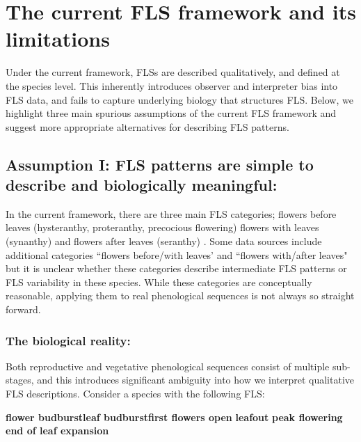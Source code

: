 \documentclass{article}
\begin{document}
{\section*{The current FLS framework and its limitations}
Under the current framework, FLSs are described qualitatively, and defined at the species level. This inherently introduces observer and interpreter bias into FLS data, and fails to capture underlying biology that structures FLS. Below, we highlight three main spurious assumptions of the current FLS framework and suggest more appropriate alternatives for describing FLS patterns.
\subsection*{Assumption I: FLS patterns are simple to describe and biologically meaningful:}
In the current framework, there are three main FLS categories; flowers before leaves (hysteranthy, proteranthy, precocious flowering) flowers with leaves (synanthy) and flowers after leaves (seranthy) \citep{Lamont2011, Heinig1899}. Some data sources \citep[e.g.][]{Burns1990,Barnes2004} include additional categories ``flowers before/with leaves' and ``flowers with/after leaves" but it is unclear whether these categories describe intermediate FLS patterns or FLS variability in these species. While these categories are conceptually reasonable, applying them to real phenological sequences is not always so straight forward.
\subsubsection*{The biological reality:}
Both reproductive and vegetative phenological sequences consist of multiple sub-stages, and this introduces significant ambiguity into how we interpret qualitative FLS descriptions. Consider a species with the following FLS:\\

\begin{center}
\textbf{flower budburst}\rightarrow \textbf{leaf budburst}\rightarrow \textbf{first flowers open} \rightarrow \textbf{leafout} \rightarrow \textbf{peak flowering} \rightarrow \textbf{end of leaf expansion}\\
\end{center}

}
\end{document}
